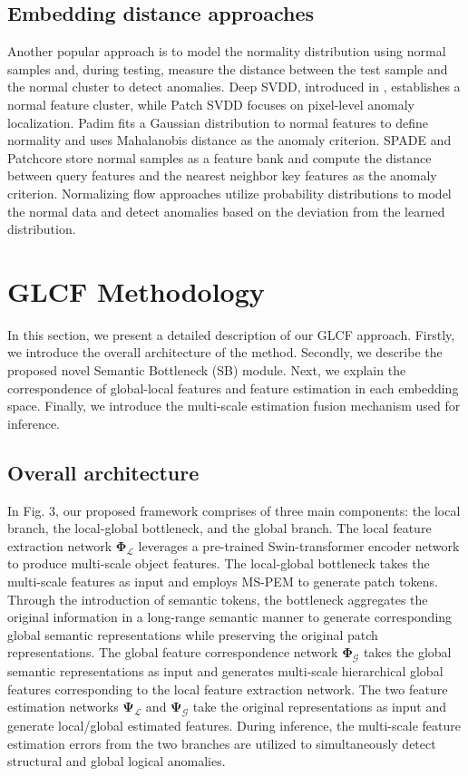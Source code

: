 \documentclass[lettersize,journal]{IEEEtran}
\begin{document}
\subsection{Embedding distance approaches}
Another popular approach is to model the normality distribution using normal samples and, during testing, measure the distance between the test sample and the normal cluster to detect anomalies. Deep SVDD, introduced in \cite{r18}, establishes a normal feature cluster, while Patch SVDD \cite{r19} focuses on pixel-level anomaly localization. Padim \cite{r23} fits a Gaussian distribution to normal features to define normality and uses Mahalanobis distance as the anomaly criterion. SPADE \cite{r21} and Patchcore \cite{r22} store normal samples as a feature bank and compute the distance between query features and the nearest neighbor key features as the anomaly criterion. Normalizing flow approaches \cite{r25, r24} utilize probability distributions to model the normal data and detect anomalies based on the deviation from the learned distribution.

\section{GLCF Methodology}

In this section, we present a detailed description of our GLCF approach. Firstly, we introduce the overall architecture of the method. Secondly, we describe the proposed novel Semantic Bottleneck (SB) module. Next, we explain the correspondence of global-local features and feature estimation in each embedding space. Finally, we introduce the multi-scale estimation fusion mechanism used for inference.



\subsection{Overall architecture}

In Fig. 3, our proposed framework comprises of three main components: the local branch, the local-global bottleneck, and the global branch. The local feature extraction network $\mathbf{\Phi_{\mathcal{L}}}$ leverages a pre-trained Swin-transformer \cite{r30} encoder network to produce multi-scale object features. The local-global bottleneck takes the multi-scale features as input and employs MS-PEM to generate patch tokens. Through the introduction of semantic tokens, the bottleneck aggregates the original information in a long-range semantic manner to generate corresponding global semantic representations while preserving the original patch representations. The global feature correspondence network $\mathbf{\Phi_{\mathcal{G}}}$ takes the global semantic representations as input and generates multi-scale hierarchical global features corresponding to the local feature extraction network. The two feature estimation networks $\mathbf{\Psi_{\mathcal{L}}}$ and $\mathbf{\Psi_{\mathcal{G}}}$ take the original representations as input and generate local/global estimated features. During inference, the multi-scale feature estimation errors from the two branches are utilized to simultaneously detect structural and global logical anomalies.
\end{document}
